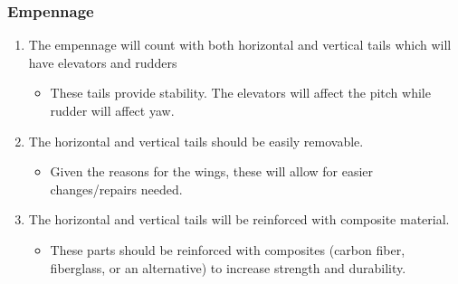 \documentclass{article}
\begin{document}
\subsubsection{Empennage}
\begin{enumerate}
  \item{The empennage will count with both horizontal and vertical tails which will have elevators and rudders}
  \begin{itemize}
    \item{These tails provide stability. The elevators will affect the pitch while rudder will affect yaw.}
  \end{itemize}
  
  \item{The horizontal and vertical tails should be easily removable.}
  \begin{itemize}
    \item{Given the reasons for the wings, these will allow for easier changes/repairs needed.}
  \end{itemize}
  
  \item{The horizontal and vertical tails will be reinforced with composite material.}
  \begin{itemize}
    \item{These parts should be reinforced with composites (carbon fiber, fiberglass, or an alternative) to increase strength and durability.}
  \end{itemize}
\end{enumerate}
\end{document}
